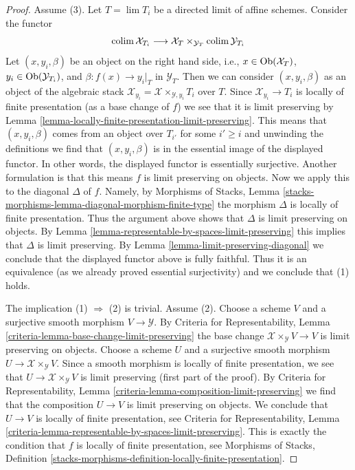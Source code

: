 \begin{proof}
Assume (3). Let $T = \lim T_i$ be a directed limit of affine schemes.
Consider the functor
$$
\mathop{\mathrm{colim}}\nolimits \mathcal{X}_{T_i} \longrightarrow
\mathcal{X}_T \times_{\mathcal{Y}_T} \mathop{\mathrm{colim}}\nolimits \mathcal{Y}_{T_i}
$$
Let $(x, y_i, \beta)$ be an object on the right hand side, i.e.,
$x \in \mathop{\mathrm{Ob}}\nolimits(\mathcal{X}_T)$, $y_i \in \mathop{\mathrm{Ob}}\nolimits(\mathcal{Y}_{T_i})$, and
$\beta : f(x) \to y_i|_T$ in $\mathcal{Y}_T$.
Then we can consider $(x, y_i, \beta)$ as an object of the
algebraic stack $\mathcal{X}_{y_i} = \mathcal{X} \times_{\mathcal{Y}, y_i} T_i$
over $T$. Since $\mathcal{X}_{y_i} \to T_i$ is locally of finite presentation
(as a base change of $f$) we see that it is limit preserving
by Lemma \ref{lemma-locally-finite-presentation-limit-preserving}.
This means that $(x, y_i, \beta)$ comes from an object over $T_{i'}$
for some $i' \geq i$ and unwinding the definitions we find that
$(x, y_i, \beta)$ is in the essential image of the displayed functor.
In other words, the displayed functor is essentially surjective.
Another formulation is that this means
$f$ is limit preserving on objects.
Now we apply this to the diagonal $\Delta$ of $f$. Namely,
by Morphisms of Stacks, Lemma
\ref{stacks-morphisms-lemma-diagonal-morphism-finite-type}
the morphism $\Delta$ is locally of finite presentation.
Thus the argument above shows that $\Delta$ is limit preserving on objects.
By Lemma \ref{lemma-representable-by-spaces-limit-preserving}
this implies that $\Delta$ is limit preserving.
By Lemma \ref{lemma-limit-preserving-diagonal}
we conclude that the displayed functor above is fully faithful.
Thus it is an equivalence (as we already proved essential surjectivity)
and we conclude that (1) holds.

\medskip\noindent
The implication (1) $\Rightarrow$ (2) is trivial. Assume (2).
Choose a scheme $V$ and a surjective smooth morphism $V \to \mathcal{Y}$.
By Criteria for Representability, Lemma
\ref{criteria-lemma-base-change-limit-preserving}
the base change $\mathcal{X} \times_\mathcal{Y} V \to V$
is limit preserving on objects.
Choose a scheme $U$ and a surjective smooth morphism
$U \to \mathcal{X} \times_\mathcal{Y} V$.
Since a smooth morphism is locally of finite presentation,
we see that $U \to \mathcal{X} \times_\mathcal{Y} V$ is
limit preserving (first part of the proof).
By Criteria for Representability, Lemma
\ref{criteria-lemma-composition-limit-preserving}
we find that the composition $U \to V$ is limit preserving
on objects. We conclude that $U \to V$ is locally of finite presentation, see
Criteria for Representability, Lemma
\ref{criteria-lemma-representable-by-spaces-limit-preserving}.
This is exactly the condition that $f$ is locally of finite presentation, see
Morphisms of Stacks, Definition
\ref{stacks-morphisms-definition-locally-finite-presentation}.
\end{proof}




